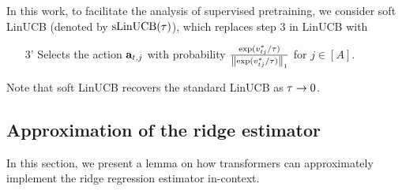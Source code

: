 In this work, to facilitate the analysis of supervised pretraining, we consider soft LinUCB (denoted by ${\mathrm{sLinUCB}}({\tau})$), which replaces step 3 in LinUCB with
\begin{enumerate}
    \item [3'] Selects the action ${\mathbf a}_{t,j}$ with probability $\frac{\exp(v^*_{tj}/{\tau})}{\left\|{\exp(v^*_{tj}/{\tau})}\right\|_1}$ for $j\in[A]$. 
\end{enumerate} Note that soft LinUCB recovers the standard LinUCB as ${\tau}\to0$. 











\subsection{Approximation of the ridge estimator}\label{app:approx-ridge-estimator}
In this section, we present a lemma on how transformers can  approximately implement the ridge regression estimator in-context. 




